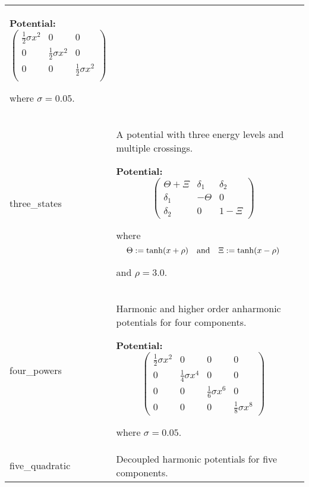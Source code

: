 \begin{longtable}{|p{\varnamewidth}|p{\vardescrwidth}|l}
\textbf{Potential:}
\begin{equation}
  \begin{pmatrix}
    \frac{1}{2} \sigma x^2 & 0                      & 0 \\
    0                      & \frac{1}{2} \sigma x^2 & 0 \\
    0                      & 0                      & \frac{1}{2} \sigma x^2 \\
  \end{pmatrix}
\end{equation}

where $\sigma = 0.05$.
&\\
\cline{1-2}
\raggedright t\-h\-r\-e\-e\-\_\-s\-t\-a\-t\-e\-s\- & \raggedright A potential with three energy levels and multiple crossings.

\textbf{Potential:}
\begin{equation}
  \begin{pmatrix}
    \Theta + \Xi & \delta_1 & \delta_2 \\
    \delta_1     & -\Theta  & 0 \\
    \delta_2     & 0        & 1 - \Xi
  \end{pmatrix}
\end{equation}

where
\begin{equation*}
  \Theta := \tanh(x + \rho) \quad \text{and} \quad
  \Xi := \tanh(x-\rho)
\end{equation*}

and $\rho = 3.0$.
&\\
\cline{1-2}
\raggedright f\-o\-u\-r\-\_\-p\-o\-w\-e\-r\-s\- & \raggedright Harmonic and higher order anharmonic potentials for four
          components.

\textbf{Potential:}
\begin{equation}
  \begin{pmatrix}
    \frac{1}{2} \sigma x^2 & 0                      & 0                      & 0 \\
    0                      & \frac{1}{4} \sigma x^4 & 0                      & 0 \\
    0                      & 0                      & \frac{1}{6} \sigma x^6 & 0 \\
    0                      & 0                      & 0                      & \frac{1}{8} \sigma x^8
  \end{pmatrix}
\end{equation}

where $\sigma = 0.05$.
&\\
\cline{1-2}
\raggedright f\-i\-v\-e\-\_\-q\-u\-a\-d\-r\-a\-t\-i\-c\- & \raggedright Decoupled harmonic potentials for five components.


\end{longtable}
